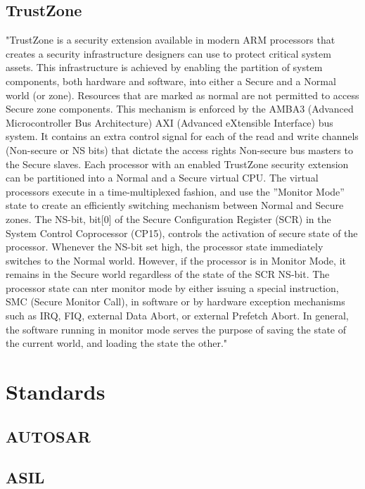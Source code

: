 \subsection{TrustZone}
\label{sec:trustzone}
"TrustZone is a security extension available in modern ARM processors that creates a security infrastructure designers can use to protect critical system assets. This infrastructure is achieved by enabling the partition of system components, both hardware and software, into either a Secure and a Normal world (or zone). Resources that are marked as normal are not permitted to access Secure zone components. This mechanism is enforced by the AMBA3 (Advanced Microcontroller Bus Architecture) AXI (Advanced eXtensible Interface) bus system. It contains an extra control signal for each of the read and write channels (Non-secure or NS bits) that dictate the access rights Non-secure bus masters to the Secure slaves. Each processor with an enabled TrustZone security extension can be partitioned into a Normal and a Secure virtual CPU. The virtual processors execute in a time-multiplexed fashion, and use the ”Monitor Mode” state to create an efficiently switching mechanism between Normal and Secure zones. The NS-bit, bit[0] of the Secure Configuration Register (SCR) in the System Control Coprocessor (CP15), controls the activation of secure state of the processor. Whenever the NS-bit set high, the processor state immediately switches to the Normal world. However, if the processor is in Monitor Mode, it remains in the Secure world regardless of the state of the SCR NS-bit. The processor state can nter monitor mode by either issuing a special instruction, SMC (Secure Monitor Call), in software or by hardware exception mechanisms such as IRQ, FIQ, external Data Abort, or external Prefetch Abort. In general, the software running in monitor mode serves the purpose of saving the state of the current world, and loading the state the other."~\cite{website:ARM} \\ %

\section{Standards}

\subsection{AUTOSAR}

\subsection{ASIL}

